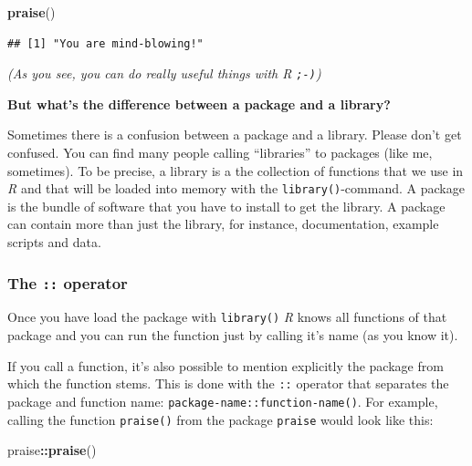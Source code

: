 \documentclass[
]{scrartcl}
\newenvironment{Shaded}{\begin{snugshade}}{\end{snugshade}}
\newcommand{\KeywordTok}[1]{\textcolor[rgb]{0.13,0.29,0.53}{\textbf{#1}}}
\newcommand{\NormalTok}[1]{#1}
\newcommand{\OperatorTok}[1]{\textcolor[rgb]{0.81,0.36,0.00}{\textbf{#1}}}
\begin{document}
\begin{Shaded}
\begin{Highlighting}[]
\KeywordTok{praise}\NormalTok{()}
\end{Highlighting}
\end{Shaded}

\begin{verbatim}
## [1] "You are mind-blowing!"
\end{verbatim}

\emph{(As you see, you can do really useful things with \emph{R} \texttt{;-)})}

\textbf{But what's the difference between a package and a library?}

Sometimes there is a confusion between a package and a library. Please don't get confused. You can find many people calling ``libraries'' to packages (like me, sometimes). To be precise, a library is a the collection of functions that we use in \emph{R} and that will be loaded into memory with the \texttt{library()}-command. A package is the bundle of software that you have to install to get the library. A package can contain more than just the library, for instance, documentation, example scripts and data.

\hypertarget{the-operator}{%
\subsubsection*{\texorpdfstring{The \texttt{::} operator}{The :: operator}}\label{the-operator}}

Once you have load the package with \texttt{library()} \emph{R} knows all functions of that package and you can run the function just by calling it's name (as you know it).

If you call a function, it's also possible to mention explicitly the package from which the function stems. This is done with the \texttt{::} operator that separates the package and function name: \texttt{package-name::function-name()}. For example, calling the function \texttt{praise()} from the package \texttt{praise} would look like this:

\begin{Shaded}
\begin{Highlighting}[]
\NormalTok{praise}\OperatorTok{::}\KeywordTok{praise}\NormalTok{()}
\end{Highlighting}
\end{Shaded}
\end{document}

